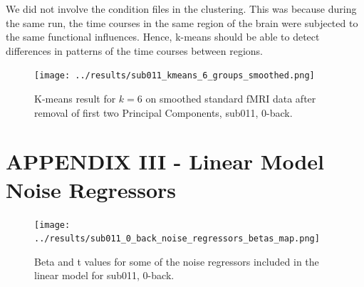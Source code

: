 \documentclass[11pt]{article}
\begin{document}
We did not involve the condition files in the clustering. This was because during
the same run, the time courses in the same region of the brain were subjected to the
same functional influences. Hence, k-means should be able to detect differences in
patterns of the time courses between regions.

\begin{figure}[H]
\centering
\texttt{[image: ../results/sub011\_kmeans\_6\_groups\_smoothed.png]}
\caption{K-means result for $k=6$ on smoothed standard fMRI data after removal of first two Principal Components, sub011, 0-back.}
\end{figure} 

\section{APPENDIX III - Linear Model Noise Regressors}

\begin{figure}[H]
\centering
\texttt{[image: ../results/sub011\_0\_back\_noise\_regressors\_betas\_map.png]}
\caption{Beta and t values for some of the noise regressors included in the linear model for sub011, 0-back.}
\end{figure} 
\end{document}
